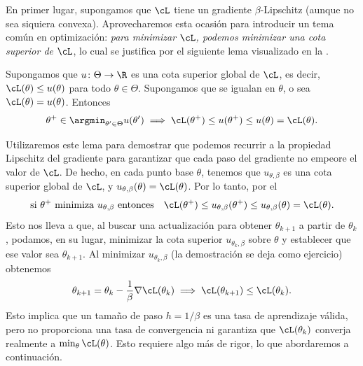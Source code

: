 \documentclass[../../book-main_es.tex]{subfiles}
\begin{document}
En primer lugar, supongamos que \(\cL\) tiene un gradiente \(\beta\)-Lipschitz
(aunque no sea siquiera convexa). Aprovecharemos esta ocasión para
introducir un tema común en optimización: \textit{para minimizar \(\cL\),
podemos minimizar una cota superior de \(\cL\)}, lo cual se justifica por el
siguiente lema visualizado en la .
\begin{lemma}\label{lem:majorization_minimization}
    Supongamos que \(u \colon \Theta \to \R\) es una cota superior global
    de \(\cL\), es decir, \(\cL(\theta) \leq u(\theta)\) para todo
    \(\theta \in \Theta\). Supongamos que se igualan en
    \(\theta\), o sea \(\cL(\theta) = u(\theta)\). Entonces
    \begin{equation}
        \theta^{+} \in \argmin_{\theta^{\prime} \in
        \Theta}u(\theta^{\prime}) \implies \cL(\theta^{+}) \leq
        u(\theta^{+}) \leq u(\theta) = \cL(\theta).
    \end{equation}
\end{lemma}

Utilizaremos este lema para demostrar que podemos recurrir a la propiedad Lipschitz del gradiente 
para garantizar que cada paso del gradiente no empeore el valor de
\(\cL\). De hecho, en cada punto base \(\theta\), tenemos que
\(u_{\theta, \beta}\) es una cota superior global de \(\cL\), y
\(u_{\theta, \beta}(\theta) = \cL(\theta)\). Por lo tanto, por el
\begin{equation}
    \text{si \(\theta^{+}\) minimiza \(u_{\theta, \beta}\) entonces}
    \quad \cL(\theta^{+}) \leq u_{\theta, \beta}(\theta^{+}) \leq
    u_{\theta, \beta}(\theta) = \cL(\theta).
\end{equation}
Esto nos lleva a que, al buscar una actualización para obtener \(\theta_{k +
1}\) a partir de \(\theta_{k}\), podamos, en su lugar, minimizar la cota superior
\(u_{\theta_{k}, \beta}\) sobre \(\theta\) y establecer que ese valor sea
\(\theta_{k + 1}\). Al minimizar \(u_{\theta_{k}, \beta}\) (la demostración se deja como
ejercicio) obtenemos
\begin{equation}\label{eq:GD}
    \theta_{k + 1} = \theta_{k} - \frac{1}{\beta}\nabla
    \cL(\theta_{k}) \implies \cL(\theta_{k + 1}) \leq \cL(\theta_{k}).
\end{equation}
Esto implica que un tamaño de paso \(h = 1/\beta\) es una tasa de aprendizaje
válida, pero no proporciona una tasa de convergencia ni garantiza que
\(\cL(\theta_{k})\) converja realmente a \(\min_{\theta}\cL(\theta)\).
Esto requiere algo más de rigor, lo que abordaremos a continuación.
\end{document}
